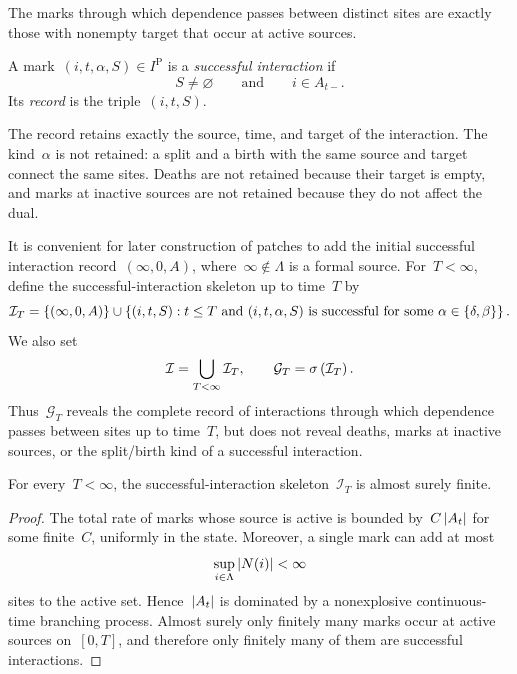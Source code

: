 \documentclass[EJP,preprint,NODS,nobera]{ejpecp}
\begin{document}
The marks through which dependence passes between distinct sites are exactly
those with nonempty target that occur at active sources.
\begin{definition}
\label{def:successful-interaction}
A mark~$(i,t,\alpha,S)\in I^{\mathrm P}$ is a \emph{successful
interaction} if
\begin{equation*}
S\neq\varnothing
\qquad\text{and}\qquad
i\in A_{t-}.
\end{equation*}
Its \emph{record} is the triple~$(i,t,S)$.
\end{definition}
The record retains exactly the source, time, and target of the interaction.
The kind~$\alpha$ is not retained: a split and a birth with the same source
and target connect the same sites. Deaths are not retained because their target
is empty, and marks at inactive sources are not retained because they do not
affect the dual.

It is convenient for later construction of patches to add the initial successful interaction record~$(\infty,0,A)$, where~$\infty\notin\Lambda$ is a formal source. For~$T<\infty$, define the successful-interaction skeleton up to time~$T$ by
\begin{equation}
\label{eq:successful-interaction-skeleton}
\mathcal I_T
=
\left\{(\infty,0,A)\right\}
\cup
\left\{
(i,t,S):
t\leq T
\text{ and }(i,t,\alpha,S)\text{ is successful for some }
\alpha\in\left\{\delta,\beta\right\}
\right\}.
\end{equation}
We also set
\begin{equation*}
\mathcal I
=
\bigcup_{T<\infty}\mathcal I_T,
\qquad
\mathcal G_T
=
\sigma\left(\mathcal I_T\right).
\end{equation*}
Thus~$\mathcal G_T$ reveals the complete record of interactions through which
dependence passes between sites up to time~$T$, but does not reveal deaths,
marks at inactive sources, or the split/birth kind of a successful
interaction.


\begin{lemma}
\label{lem:dual-local-finiteness}
For every~$T<\infty$, the successful-interaction skeleton~$\mathcal I_T$ is
almost surely finite.
\end{lemma}

\begin{proof}
The total rate of marks whose source is active is bounded by~$C\left|A_t\right|$ for some finite~$C$, uniformly in the state. Moreover, a single
mark can add at most
\begin{equation*}
\sup_{i\in\Lambda}\left|N(i)\right|<\infty
\end{equation*}
sites to the active set. Hence~$\left|A_t\right|$ is dominated by a nonexplosive
continuous-time branching process. Almost surely only finitely many marks occur
at active sources on~$[0,T]$, and therefore only finitely many of them are
successful interactions.
\end{proof}
\end{document}
